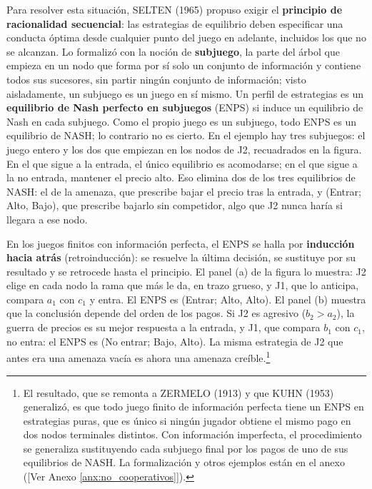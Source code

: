 \documentclass[10pt,a4paper]{article}
\newcommand{\authorfont}[1]{{\fontfamily{EBGaramond-TLF}\selectfont #1}}
\newcounter{anexo}
\begin{document}
Para resolver esta situación, SELTEN (1965) propuso exigir el \textbf{principio de racionalidad secuencial}: las estrategias de equilibrio deben especificar una conducta óptima desde cualquier punto del juego en adelante, incluidos los que no se alcanzan. Lo formalizó con la noción de \textbf{subjuego}, la parte del árbol que empieza en un nodo que forma por sí solo un conjunto de información y contiene todos sus sucesores, sin partir ningún conjunto de información; visto aisladamente, un subjuego es un juego en sí mismo. Un perfil de estrategias es un \textbf{equilibrio de Nash perfecto en subjuegos} (ENPS) si induce un equilibrio de Nash en cada subjuego. Como el propio juego es un subjuego, todo ENPS es un equilibrio de NASH; lo contrario no es cierto. En el ejemplo hay tres subjuegos: el juego entero y los dos que empiezan en los nodos de J2, recuadrados en la figura. En el que sigue a la entrada, el único equilibrio es acomodarse; en el que sigue a la no entrada, mantener el precio alto. Eso elimina dos de los tres equilibrios de NASH: el de la amenaza, que prescribe bajar el precio tras la entrada, y (Entrar; Alto, Bajo), que prescribe bajarlo sin competidor, algo que J2 nunca haría si llegara a ese nodo.

En los juegos finitos con información perfecta, el ENPS se halla por \textbf{inducción hacia atrás} (retroinducción): se resuelve la última decisión, se sustituye por su resultado y se retrocede hasta el principio. El panel (a) de la figura lo muestra: J2 elige en cada nodo la rama que más le da, en trazo grueso, y J1, que lo anticipa, compara $a_1$ con $c_1$ y entra. El ENPS es (Entrar; Alto, Alto). El panel (b) muestra que la conclusión depende del orden de los pagos. Si J2 es agresivo ($b_2>a_2$), la guerra de precios es su mejor respuesta a la entrada, y J1, que compara $b_1$ con $c_1$, no entra: el ENPS es (No entrar; Bajo, Alto). La misma estrategia de J2 que antes era una amenaza vacía es ahora una amenaza creíble.\footnote{%
  El resultado, que se remonta a ZERMELO (1913) y que KUHN (1953) generalizó, es que todo juego finito de información perfecta tiene un ENPS en estrategias puras, que es único si ningún jugador obtiene el mismo pago en dos nodos terminales distintos. Con información imperfecta, el procedimiento se generaliza sustituyendo cada subjuego final por los pagos de uno de sus equilibrios de NASH. La formalización y otros ejemplos están en el anexo ([\authorfont{Ver Anexo \ref{anx:no_cooperativos}}]).
}
\end{document}
